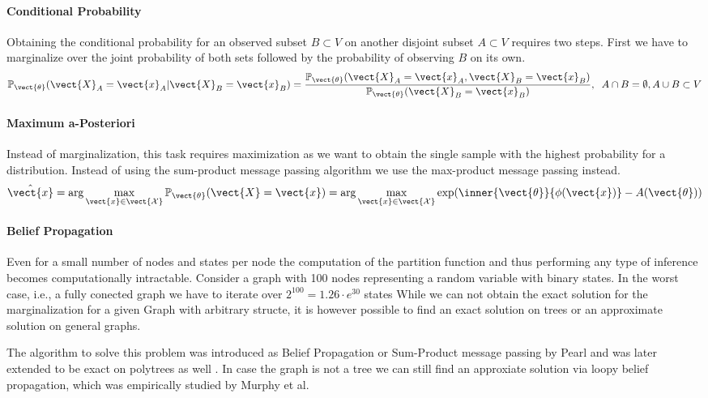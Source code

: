 \paragraph*{Conditional Probability}
Obtaining the conditional probability for an observed subset $B \subset V$ on another disjoint subset $A \subset V$ requires two steps. First we have to marginalize over the joint probability of both sets followed by the probability of observing $B$ on its own.
    \begin{equation}
        \mathbb{P}_{\vect{\theta}}(\vect{X}_A = \vect{x}_A \lvert \vect{X}_B = \vect{x}_B) = \frac{\mathbb{P}_{\vect{\theta}}(\vect{X}_A = \vect{x}_A , \vect{X}_B = \vect{x}_B)}{\mathbb{P}_{\vect{\theta}}(\vect{X}_B = \vect{x}_B)}, \;\; A \cap B = \emptyset, A \cup B \subset V
    \end{equation}

\paragraph*{Maximum a-Posteriori}
Instead of marginalization, this task requires maximization as we want to obtain the single sample with the highest probability for a distribution. 
Instead of using the sum-product message passing algorithm we use the max-product message passing instead.
\begin{equation}
    \label{eq:map}
    \hat{\vect{x}} = \arg\max_{\vect{x} \in \vect{\mathcal{X}}} \mathbb{P}_{\vect{\theta}}(\vect{X} = \vect{x}) = \arg\max_{\vect{x} \in \vect{\mathcal{X}}} \exp(\inner{\vect{\theta}}{\phi(\vect{x})} - A(\vect{\theta}))
\end{equation}

\paragraph*{Belief Propagation}
Even for a small number of nodes and states per node the computation of the partition function and thus performing any type of inference becomes computationally intractable.
Consider a graph with 100 nodes representing a random variable with binary states.
In the worst case, i.e., a fully conected graph we have to iterate over $2^{100} = 1.26\cdot e^{30}$ states
While we can not obtain the exact solution for the marginalization for a given Graph with arbitrary structe, it is however possible to find an exact solution on trees or an approximate solution on general graphs.


The algorithm to solve this problem was introduced as Belief Propagation or Sum-Product message passing by Pearl \cite{pearl1982reverend} and was later extended to be exact on polytrees as well \cite{kim1983computational}.
In case the graph is not a tree we can still find an approxiate solution via loopy belief propagation, which was empirically studied by Murphy et al. \cite{murphy2013loopy}

